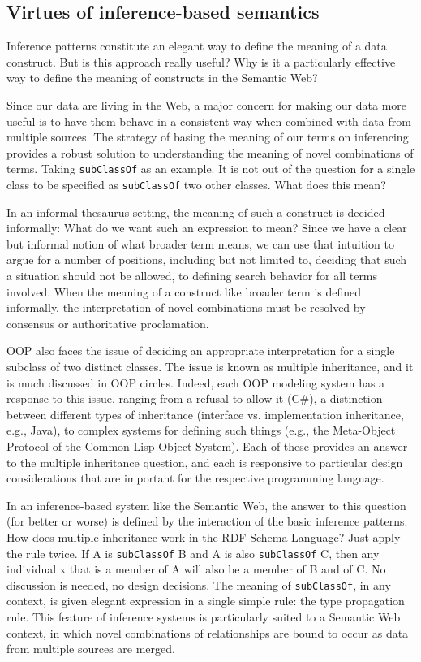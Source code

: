 \subsection{Virtues of inference-based semantics}

Inference patterns constitute an elegant way to define the meaning of a
data construct. But is this approach really useful? Why is it a
particularly effective way to define the meaning of constructs in the
Semantic Web?

Since our data are living in the Web, a major concern for making our
data more useful is to have them behave in a consistent way when
combined with data from multiple sources. The strategy of basing the
meaning of our terms on inferencing provides a robust solution to
understanding the meaning of novel combinations of terms. Taking
\texttt{subClassOf} as an example. It is not out of the question for a single
class to be specified as \texttt{subClassOf} two other classes. What does this
mean?

In an informal thesaurus setting, the meaning of such a construct is
decided informally: What do we
want such an expression to mean? Since we have a clear but informal
notion of what broader term means, we can use that intuition to argue
for a number of positions, including but not limited to, deciding that
such a situation should not be allowed, to defining search behavior for
all terms involved. When the meaning of a construct like broader term is
defined informally, the interpretation of novel combinations must be
resolved by consensus or authoritative proclamation.


\begin{sidebar}{}
OOP also faces the issue of deciding an appropriate interpretation for a
single subclass of two distinct classes. The issue is known as multiple
inheritance, and it is much discussed in OOP circles. Indeed, each OOP
modeling system has a response to this issue, ranging from a refusal to
allow it (C\#), a distinction between different types of inheritance
(interface vs. implementation inheritance, e.g., Java), to complex
systems for defining such things (e.g., the Meta-Object Protocol of the
Common Lisp Object System). Each of these provides an answer to the
multiple inheritance question, and each is responsive to particular
design considerations that are important for the respective programming
language.
\end{sidebar}

In an inference-based system like the Semantic Web, the answer to this
question (for better or worse) is defined by the interaction of the
basic inference patterns. How does multiple inheritance work in the RDF
Schema Language? Just apply the rule twice. If A is \texttt{subClassOf} B and A
is also \texttt{subClassOf} C, then any individual x that is a member of A will
also be a member of B and of C. No discussion is needed, no design
decisions. The meaning of \texttt{subClassOf}, in any context, is given elegant
expression in a single simple rule: the type propagation rule. This
feature of inference systems is particularly suited to a Semantic Web
context, in which novel combinations of relationships are bound to occur
as data from multiple sources are merged.

